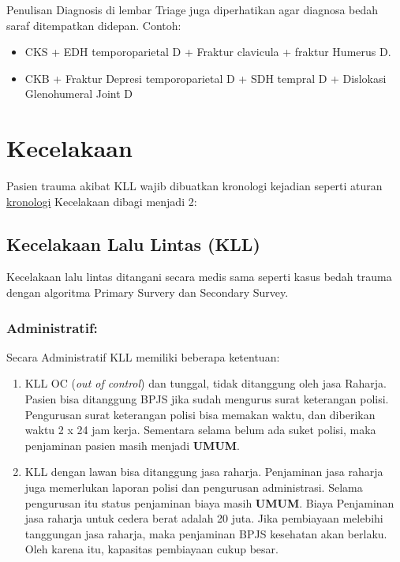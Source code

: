 \documentclass[
]{book}
\providecommand{\tightlist}{%
  \setlength{\itemsep}{0pt}\setlength{\parskip}{0pt}}
\begin{document}
Penulisan Diagnosis di lembar Triage juga diperhatikan agar diagnosa bedah saraf ditempatkan didepan. Contoh:

\begin{itemize}
\tightlist
\item
  CKS + EDH temporoparietal D + Fraktur clavicula + fraktur Humerus D.
\item
  CKB + Fraktur Depresi temporoparietal D + SDH tempral D + Dislokasi Glenohumeral Joint D
\end{itemize}

\hypertarget{kecelakaan}{%
\section{Kecelakaan}\label{kecelakaan}}

Pasien trauma akibat KLL wajib dibuatkan kronologi kejadian seperti aturan \protect\hyperlink{kronologi}{kronologi}
Kecelakaan dibagi menjadi 2:

\hypertarget{kecelakaan-lalu-lintas-kll}{%
\subsection{Kecelakaan Lalu Lintas (KLL)}\label{kecelakaan-lalu-lintas-kll}}

Kecelakaan lalu lintas ditangani secara medis sama seperti kasus bedah trauma dengan algoritma Primary Survery dan Secondary Survey.

\hypertarget{administratif}{%
\subsubsection{Administratif:}\label{administratif}}

Secara Administratif KLL memiliki beberapa ketentuan:

\begin{enumerate}
\def\labelenumi{\arabic{enumi}.}
\item
  KLL OC (\emph{out of control}) dan tunggal, tidak ditanggung oleh jasa Raharja. Pasien bisa ditanggung BPJS jika sudah mengurus surat keterangan polisi. Pengurusan surat keterangan polisi bisa memakan waktu, dan diberikan waktu 2 x 24 jam kerja. Sementara selama belum ada suket polisi, maka penjaminan pasien masih menjadi \textbf{UMUM}.
\item
  KLL dengan lawan bisa ditanggung jasa raharja. Penjaminan jasa raharja juga memerlukan laporan polisi dan pengurusan administrasi. Selama pengurusan itu status penjaminan biaya masih \textbf{UMUM}. Biaya Penjaminan jasa raharja untuk cedera berat adalah 20 juta. Jika pembiayaan melebihi tanggungan jasa raharja, maka penjaminan BPJS kesehatan akan berlaku. Oleh karena itu, kapasitas pembiayaan cukup besar.
\end{enumerate}
\end{document}
